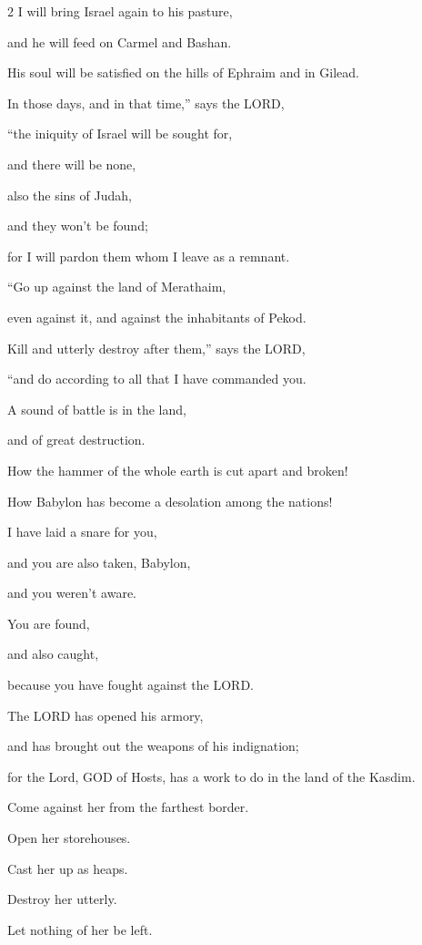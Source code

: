 \begin{multicols}{2}
\myverse{}I will bring Israel again to his pasture,

and he will feed on Carmel and Bashan.

His soul will be satisfied on the hills of Ephraim and in Gilead.


\myverse{}In those days, and in that time,” says the LORD,

“the iniquity of Israel will be sought for,

and there will be none,

also the sins of Judah,

and they won’t be found;

for I will pardon them whom I leave as a remnant.

\vspace{\baselineskip}

\myverse{}“Go up against the land of Merathaim,

even against it, and against the inhabitants of Pekod.

Kill and utterly destroy after them,” says the LORD,

“and do according to all that I have commanded you.


\myverse{}A sound of battle is in the land,

and of great destruction.


\myverse{}How the hammer of the whole earth is cut apart and broken!

How Babylon has become a desolation among the nations!


\myverse{}I have laid a snare for you,

and you are also taken, Babylon,

and you weren’t aware.

You are found,

and also caught,

because you have fought against the LORD.


\myverse{}The LORD has opened his armory,

and has brought out the weapons of his indignation;

for the Lord, GOD of Hosts, has a work to do in the land of the Kasdim.


\myverse{}Come against her from the farthest border.

Open her storehouses.

Cast her up as heaps.

Destroy her utterly.

Let nothing of her be left.



\end{multicols}
